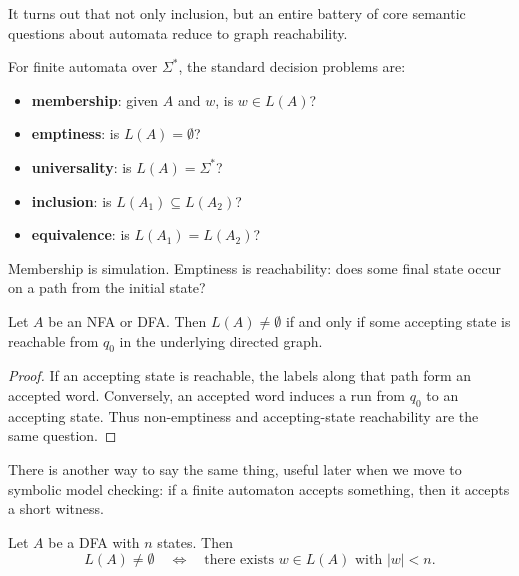 It turns out that not only inclusion, but an entire battery of core semantic questions about automata reduce to graph reachability.


\begin{definition}
\label{def:finite-decision-problems}
For finite automata over $\Sigma^*$, the standard decision problems are:
\begin{itemize}[nosep]
  \item \textbf{membership}: given $A$ and $w$, is $w\in L(A)$?
  \item \textbf{emptiness}: is $L(A)=\emptyset$?
  \item \textbf{universality}: is $L(A)=\Sigma^*$?
  \item \textbf{inclusion}: is $L(A_1)\subseteq L(A_2)$?
  \item \textbf{equivalence}: is $L(A_1)=L(A_2)$?
\end{itemize}
\end{definition}

Membership is simulation.  Emptiness is reachability: does some final
state occur on a path from the initial state?

\begin{proposition}
\label{prop:finite-emptiness}
Let $A$ be an NFA or DFA.  Then $L(A)\neq\emptyset$ if and only if some
accepting state is reachable from $q_0$ in the underlying directed graph.
\end{proposition}

\begin{proof}
If an accepting state is reachable, the labels along that path form an
accepted word.  Conversely, an accepted word induces a run from $q_0$ to
an accepting state.  Thus non-emptiness and accepting-state reachability
are the same question.
\end{proof}

There is another way to say the same thing, useful later when we move to
symbolic model checking: if a finite automaton accepts something, then it
accepts a short witness.

\begin{theorem}
\label{thm:small-model-finite}
Let $A$ be a DFA with $n$ states.  Then
\[
  L(A)\neq\emptyset
  \quad\Longleftrightarrow\quad
  \text{there exists }w\in L(A)\text{ with }|w|<n.
\]
\end{theorem}

